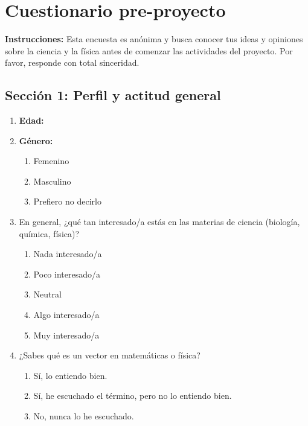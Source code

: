 \documentclass[10pt,a4paper]{article}
\begin{document}
\newpage
\appendix

\section{Cuestionario pre-proyecto}

\noindent\textbf{Instrucciones:} Esta encuesta es anónima y busca conocer tus ideas y opiniones sobre la ciencia y la física antes de comenzar las actividades del proyecto. Por favor, responde con total sinceridad.

\subsection{Sección 1: Perfil y actitud general}
\begin{enumerate}
 \item \textbf{Edad:} \underline{\hspace{2cm}}

    \item \textbf{Género:}
    \begin{enumerate}[label=\alph*)]
        \item Femenino
        \item Masculino
        \item Prefiero no decirlo
    \end{enumerate}
    \item En general, ¿qué tan interesado/a estás en las materias de ciencia (biología, química, física)?
    \begin{enumerate}[label=\alph*)]
        \item Nada interesado/a
        \item Poco interesado/a
        \item Neutral
        \item Algo interesado/a
        \item Muy interesado/a
    \end{enumerate}

    \item ¿Sabes qué es un vector en matemáticas o física?
    \begin{enumerate}[label=\alph*)]
        \item Sí, lo entiendo bien.
        \item Sí, he escuchado el término, pero no lo entiendo bien.
        \item No, nunca lo he escuchado.
    \end{enumerate}


\end{enumerate}
\end{document}
